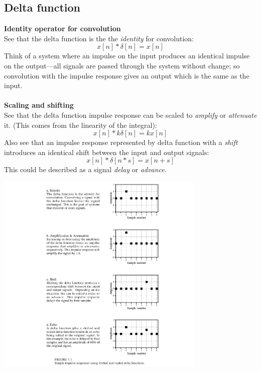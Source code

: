 \documentclass{report}
\begin{document}
\subsection{Delta function}
\textbf{Identity operator for convolution}\\
See
that the delta function is the the \textit{identity} for convolution:
\begin{equation*}
x[n]*\delta[n]=x[n]
\end{equation*}
Think of a system where an impulse on the input produces an identical impulse on the output---all signals are
passed through the system without change; so convolution with the impulse response gives an output which is the
same as the input.\\
\vspace{1mm}\\
\textbf{Scaling and shifting}\\
See that the delta function impulse response can be scaled to \textit{amplify} or \textit{attenuate} it. 
(This comes from the linearity of the integral):
\begin{equation*}
x[n]*k\delta[n]=kx[n]
\end{equation*}
Also see that an impulse response represented by delta function with a \textit{shift} introduces an identical shift between the input and output signals:
\begin{equation*}
x[n]*\delta[n*s]=x[n+s]
\end{equation*}
This could be described as a signal \textit{delay} or \textit{advance}.
\begin{center}
\includegraphics[width=10cm]{a9}\\
\end{center}
\newpage
\end{document}
